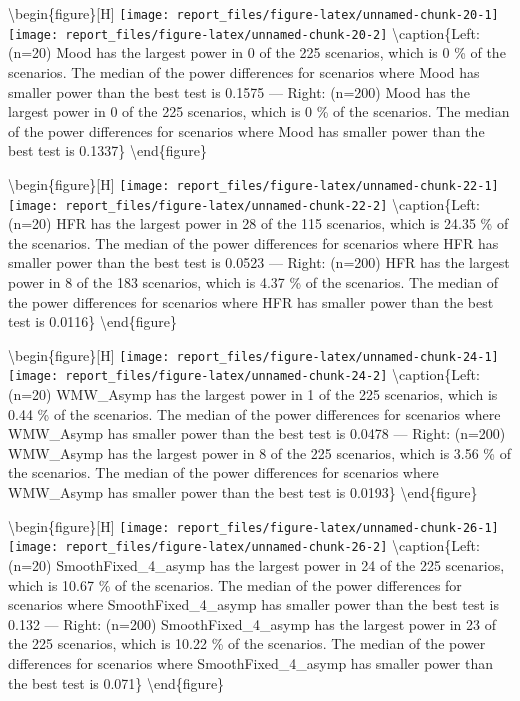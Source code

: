 \documentclass[
]{article}
\begin{document}
\textbackslash begin\{figure\}{[}H{]}
\texttt{[image: report\_files/figure-latex/unnamed-chunk-20-1]}
\texttt{[image: report\_files/figure-latex/unnamed-chunk-20-2]}
\textbackslash caption\{Left:(n=20) Mood has the largest power in 0 of
the 225 scenarios, which is 0 \% of the scenarios. The median of the
power differences for scenarios where Mood has smaller power than the
best test is 0.1575 --- Right: (n=200) Mood has the largest power in 0
of the 225 scenarios, which is 0 \% of the scenarios. The median of the
power differences for scenarios where Mood has smaller power than the
best test is 0.1337\}\label{fig:unnamed-chunk-20}
\textbackslash end\{figure\}

\textbackslash begin\{figure\}{[}H{]}
\texttt{[image: report\_files/figure-latex/unnamed-chunk-22-1]}
\texttt{[image: report\_files/figure-latex/unnamed-chunk-22-2]}
\textbackslash caption\{Left:(n=20) HFR has the largest power in 28 of
the 115 scenarios, which is 24.35 \% of the scenarios. The median of the
power differences for scenarios where HFR has smaller power than the
best test is 0.0523 --- Right: (n=200) HFR has the largest power in 8 of
the 183 scenarios, which is 4.37 \% of the scenarios. The median of the
power differences for scenarios where HFR has smaller power than the
best test is 0.0116\}\label{fig:unnamed-chunk-22}
\textbackslash end\{figure\}

\textbackslash begin\{figure\}{[}H{]}
\texttt{[image: report\_files/figure-latex/unnamed-chunk-24-1]}
\texttt{[image: report\_files/figure-latex/unnamed-chunk-24-2]}
\textbackslash caption\{Left:(n=20) WMW\_Asymp has the largest power in
1 of the 225 scenarios, which is 0.44 \% of the scenarios. The median of
the power differences for scenarios where WMW\_Asymp has smaller power
than the best test is 0.0478 --- Right: (n=200) WMW\_Asymp has the
largest power in 8 of the 225 scenarios, which is 3.56 \% of the
scenarios. The median of the power differences for scenarios where
WMW\_Asymp has smaller power than the best test is
0.0193\}\label{fig:unnamed-chunk-24} \textbackslash end\{figure\}

\textbackslash begin\{figure\}{[}H{]}
\texttt{[image: report\_files/figure-latex/unnamed-chunk-26-1]}
\texttt{[image: report\_files/figure-latex/unnamed-chunk-26-2]}
\textbackslash caption\{Left:(n=20) SmoothFixed\_4\_asymp has the
largest power in 24 of the 225 scenarios, which is 10.67 \% of the
scenarios. The median of the power differences for scenarios where
SmoothFixed\_4\_asymp has smaller power than the best test is 0.132 ---
Right: (n=200) SmoothFixed\_4\_asymp has the largest power in 23 of the
225 scenarios, which is 10.22 \% of the scenarios. The median of the
power differences for scenarios where SmoothFixed\_4\_asymp has smaller
power than the best test is 0.071\}\label{fig:unnamed-chunk-26}
\textbackslash end\{figure\}
\end{document}
